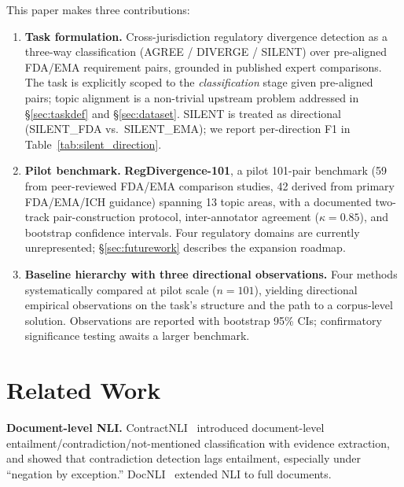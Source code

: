 \documentclass[manuscript]{acmart}
\begin{document}
This paper makes three contributions:
\begin{enumerate}
\item \textbf{Task formulation.} Cross-jurisdiction regulatory divergence
  detection as a three-way classification (AGREE / DIVERGE / SILENT) over
  pre-aligned FDA/EMA requirement pairs, grounded in published expert
  comparisons. The task is explicitly scoped to the \textit{classification}
  stage given pre-aligned pairs; topic alignment is a non-trivial upstream
  problem addressed in \S\ref{sec:taskdef} and \S\ref{sec:dataset}. SILENT
  is treated as directional (SILENT\_FDA vs.\ SILENT\_EMA); we report
  per-direction F1 in Table~\ref{tab:silent_direction}.
\item \textbf{Pilot benchmark.} \textbf{RegDivergence-101}, a pilot 101-pair
  benchmark (59 from peer-reviewed FDA/EMA comparison studies, 42 derived from
  primary FDA/EMA/ICH guidance) spanning 13 topic areas, with a documented
  two-track pair-construction protocol, inter-annotator agreement
  ($\kappa = 0.85$), and bootstrap confidence intervals. Four regulatory
  domains are currently unrepresented; \S\ref{sec:futurework} describes the
  expansion roadmap.
\item \textbf{Baseline hierarchy with three directional observations.} Four
  methods systematically compared at pilot scale ($n = 101$), yielding
  directional empirical observations on the task's structure and the path to a
  corpus-level solution. Observations are reported with bootstrap 95\% CIs;
  confirmatory significance testing awaits a larger benchmark.
\end{enumerate}

\section{Related Work}

\textbf{Document-level NLI.} ContractNLI~\cite{koreeda2021contractnli} introduced
document-level entailment/contradiction/not-mentioned classification with
evidence extraction, and showed that contradiction detection lags entailment,
especially under ``negation by exception.'' DocNLI~\cite{yin2021docnli} extended
NLI to full documents.
\end{document}
